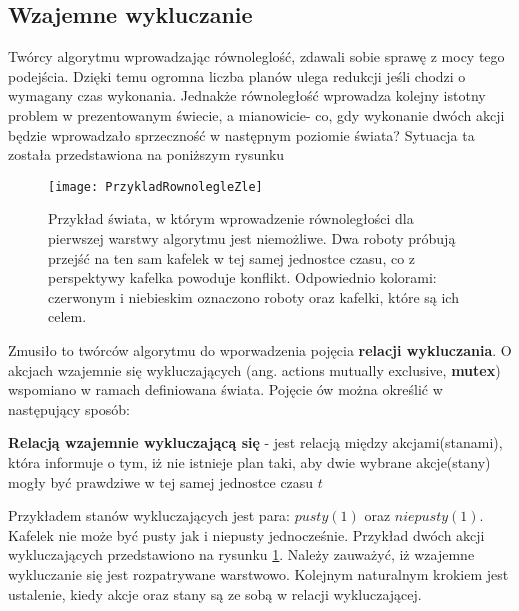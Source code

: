     \subsection{Wzajemne wykluczanie}
    \label{WzajemneWykluczanieRozdzial}
    Twórcy algorytmu wprowadzając równoleglość, zdawali sobie sprawę z mocy tego podejścia. Dzięki temu ogromna liczba planów ulega redukcji
    jeśli chodzi o wymagany czas wykonania. Jednakże równoległość wprowadza kolejny istotny problem w prezentowanym świecie, a mianowicie- co, gdy
    wykonanie dwóch akcji będzie wprowadzało sprzeczność w następnym poziomie świata? Sytuacja ta została przedstawiona na poniższym rysunku
    \begin{figure}[H]
        \texttt{[image: PrzykladRownolegleZle]}
        \centering
        \caption{Przykład świata, w którym wprowadzenie równoległości dla pierwszej warstwy algorytmu jest niemożliwe. 
        Dwa roboty próbują przejść na ten sam kafelek
        w tej samej jednostce czasu, co z perspektywy kafelka powoduje konflikt. Odpowiednio kolorami:
        czerwonym i niebieskim oznaczono roboty oraz kafelki, które są ich celem.}
        \label{PrzykladRownolegle}
    \end{figure}
    
    Zmusiło to twórców algorytmu do wporwadzenia pojęcia \textbf{relacji wykluczania}. 
    O akcjach wzajemnie się wykluczających (ang. actions mutually exclusive, \textbf{mutex}) wspomiano w ramach definiowana świata. Pojęcie ów można 
    określić w następujący sposób:
    \begin{definition}
        \label{Warstwa}
        \textbf{Relacją wzajemnie wykluczającą się} - jest relacją między akcjami(stanami), która informuje o tym, iż nie istnieje plan taki,
        aby dwie wybrane akcje(stany) mogły być prawdziwe w tej samej jednostce czasu $t$
    \end{definition}
    Przykładem stanów wykluczających jest para: $pusty(1)$ oraz $niepusty(1)$. Kafelek nie może być pusty jak i niepusty jednocześnie.
    Przykład dwóch akcji wykluczających przedstawiono na rysunku \ref{PrzykladRownolegle}. Należy zauważyć, iż wzajemne wykluczanie się 
    jest rozpatrywane warstwowo.
    Kolejnym naturalnym krokiem jest ustalenie, kiedy akcje oraz stany są ze sobą w relacji wykluczającej. 

